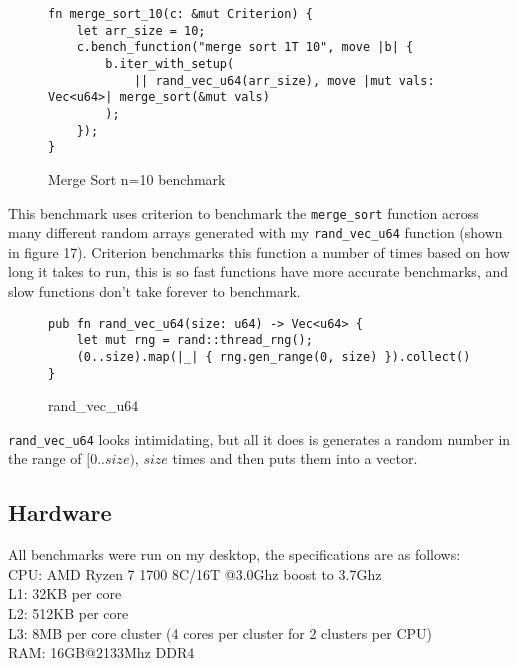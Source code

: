 \documentclass[12pt,letterpaper]{report}
\newcommand{\rust}[1]{\texttt{#1}}
\begin{document}
	\begin{figure}[H]
	\begin{verbatim}
fn merge_sort_10(c: &mut Criterion) {
    let arr_size = 10;
    c.bench_function("merge sort 1T 10", move |b| {
        b.iter_with_setup(
            || rand_vec_u64(arr_size), move |mut vals: Vec<u64>| merge_sort(&mut vals)
        );
    });
}
	\end{verbatim}
    \caption{Merge Sort n=10 benchmark}
\end{figure}


	This benchmark uses criterion to benchmark the \rust{merge_sort} function across many different random arrays generated with my \rust{rand_vec_u64} function (shown in figure 17). Criterion benchmarks this function a number of times based on how long it takes to run, this is so fast functions have more accurate benchmarks, and slow functions don't take forever to benchmark.
	
	\begin{figure}[H]
	\begin{verbatim}
pub fn rand_vec_u64(size: u64) -> Vec<u64> {
    let mut rng = rand::thread_rng();
    (0..size).map(|_| { rng.gen_range(0, size) }).collect()
}
	\end{verbatim}
    \caption{rand\_vec\_u64}
\end{figure}

	\rust{rand_vec_u64} looks intimidating, but all it does is generates a random number in the range of $[0..size)$, $size$ times and then puts them into a vector.

	\subsection*{Hardware}
	
	All benchmarks were run on my desktop, the specifications are as follows:\\
	
	CPU: AMD Ryzen 7 1700 8C/16T @3.0Ghz boost to 3.7Ghz\\
	
	L1: 32KB per core\\
	
	L2: 512KB per core\\
	
	L3: 8MB per core cluster (4 cores per cluster for 2 clusters per CPU)\\
	
	RAM: 16GB@2133Mhz DDR4\\
	
\end{document}
